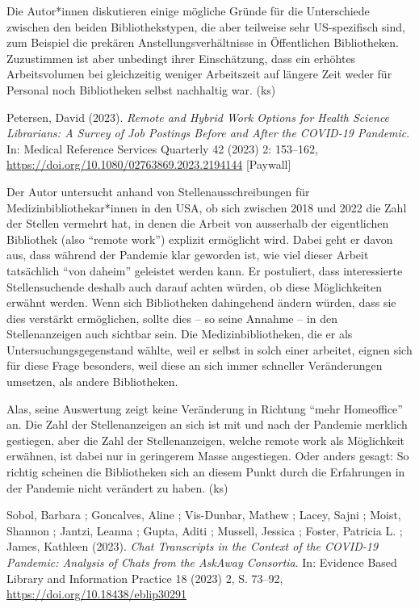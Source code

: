 \documentclass[a4paper,
fontsize=11pt,
oneside,
numbers=noperiodatend,
parskip=half-,
bibliography=totoc,
final
]{scrartcl}
\begin{document}
Die Autor*innen diskutieren einige mögliche Gründe für die Unterschiede
zwischen den beiden Bibliothekstypen, die aber teilweise sehr
US-spezifisch sind, zum Beispiel die prekären Anstellungsverhältnisse in
Öffentlichen Bibliotheken. Zuzustimmen ist aber unbedingt ihrer
Einschätzung, dass ein erhöhtes Arbeitsvolumen bei gleichzeitig weniger
Arbeitszeit auf längere Zeit weder für Personal noch Bibliotheken selbst
nachhaltig war. (ks)

Petersen, David (2023). \emph{Remote and Hybrid Work Options for Health
Science Librarians: A Survey of Job Postings Before and After the
COVID-19 Pandemic}. In: Medical Reference Services Quarterly 42 (2023)
2: 153--162, \url{https://doi.org/10.1080/02763869.2023.2194144}
{[}Paywall{]}

Der Autor untersucht anhand von Stellenausschreibungen für
Medizinbibliothekar*innen in den USA, ob sich zwischen 2018 und 2022 die
Zahl der Stellen vermehrt hat, in denen die Arbeit von ausserhalb der
eigentlichen Bibliothek (also \enquote{remote work}) explizit ermöglicht
wird. Dabei geht er davon aus, dass während der Pandemie klar geworden
ist, wie viel dieser Arbeit tatsächlich \enquote{von daheim} geleistet
werden kann. Er postuliert, dass interessierte Stellensuchende deshalb
auch darauf achten würden, ob diese Möglichkeiten erwähnt werden. Wenn
sich Bibliotheken dahingehend ändern würden, dass sie dies verstärkt
ermöglichen, sollte dies -- so seine Annahme -- in den Stellenanzeigen
auch sichtbar sein. Die Medizinbibliotheken, die er als
Untersuchungsgegenstand wählte, weil er selbst in solch einer arbeitet,
eignen sich für diese Frage besonders, weil diese an sich immer
schneller Veränderungen umsetzen, als andere Bibliotheken.

Alas, seine Auswertung zeigt keine Veränderung in Richtung \enquote{mehr
Homeoffice} an. Die Zahl der Stellenanzeigen an sich ist mit und nach
der Pandemie merklich gestiegen, aber die Zahl der Stellenanzeigen,
welche remote work als Möglichkeit erwähnen, ist dabei nur in geringerem
Masse angestiegen. Oder anders gesagt: So richtig scheinen die
Bibliotheken sich an diesem Punkt durch die Erfahrungen in der Pandemie
nicht verändert zu haben. (ks)

Sobol, Barbara ; Goncalves, Aline ; Vis-Dunbar, Mathew ; Lacey, Sajni ;
Moist, Shannon ; Jantzi, Leanna ; Gupta, Aditi ; Mussell, Jessica ;
Foster, Patricia L. ; James, Kathleen (2023). \emph{Chat Transcripts in
the Context of the COVID-19 Pandemic: Analysis of Chats from the AskAway
Consortia}. In: Evidence Based Library and Information Practice 18
(2023) 2, S. 73--92, \url{https://doi.org/10.18438/eblip30291}
\end{document}
